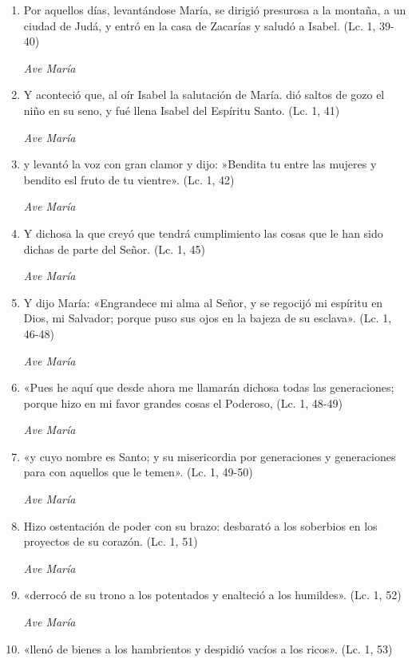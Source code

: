 \documentclass[a4paper,11pt, oneside]{report}
\begin{document}
      \begin{enumerate}
        
        \item Por aquellos días, levantándose María, se dirigió presurosa a la montaña, a un ciudad de Judá, y entró en la casa
        de Zacarías y saludó a Isabel. (Lc. 1, 39-40)
        
        \textit{Ave María}

        \item Y aconteció que, al oír Isabel la salutación de María. dió saltos de gozo el niño en su seno, y fué llena Isabel del Espíritu Santo. (Lc. 1, 41)
        
        \textit{Ave María}

        \item y levantó la voz con gran clamor y dijo: »Bendita tu entre las mujeres y bendito esl fruto de tu vientre». (Lc. 1, 42)
        
        \textit{Ave María}

        \item Y dichosa la que creyó que tendrá cumplimiento las cosas que le han sido dichas de parte del Señor. (Lc. 1, 45)
        
        \textit{Ave María}

        \item Y dijo María: «Engrandece mi alma al Señor, y se regocijó mi espíritu en Dios, mi Salvador;
        porque puso sus ojos en la bajeza de su esclava». (Lc. 1, 46-48)

        \textit{Ave María}

        \item «Pues he aquí que desde ahora me llamarán dichosa todas las generaciones; 
        porque hizo en mi favor grandes cosas el Poderoso, (Lc. 1, 48-49)
        
        \textit{Ave María}

        \item «y cuyo nombre es Santo; y su misericordia por generaciones y generaciones para con aquellos que le temen». (Lc. 1, 49-50)
        
        \textit{Ave María}

        \item Hizo ostentación de poder con su brazo: desbarató a los soberbios en los proyectos de su corazón. (Lc. 1, 51)
        
        \textit{Ave María}

        \item «derrocó de su trono a los potentados y enalteció a los humildes». (Lc. 1, 52)
        
        \textit{Ave María}

        \item «llenó de bienes a los hambrientos y despidió vacíos a los ricos». (Lc. 1, 53)

      \end{enumerate}
\end{document}
